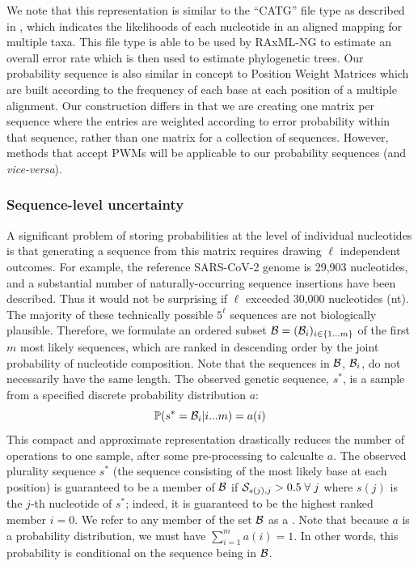 \documentclass[10pt]{article}
\begin{document}
We note that this representation is similar to the ``CATG'' file type as described in \citet{kozlovModelsOptimizationsTools2018}, which indicates the likelihoods of each nucleotide in an aligned mapping for multiple taxa. 
This file type is able to be used by RAxML-NG to estimate an overall error rate which is then used to estimate phylogenetic trees.
Our probability sequence is also similar in concept to Position Weight Matrices \citep[PWMs, ][]{stormoUsePerceptronAlgorithm1982} which are built according to the frequency of each base at each position of a multiple alignment. 
Our construction differs in that we are creating one matrix per sequence where the entries are weighted according to error probability within that sequence, rather than one matrix for a collection of sequences. 
However, methods that accept PWMs will be applicable to our probability sequences (and \emph{vice-versa}).


\subsubsection{Sequence-level uncertainty}

A significant problem of storing probabilities at the level of individual nucleotides is that generating a sequence from this matrix requires drawing $\ell$ independent outcomes.
For example, the reference SARS-CoV-2 genome is 29,903 nucleotides, and a substantial number of naturally-occurring sequence insertions have been described.
Thus it would not be surprising if $\ell$ exceeded 30,000 nucleotides (nt).
The majority of these technically possible $5^\ell$ sequences are not biologically plausible.
Therefore, we formulate an ordered subset $\mathcal{B} = (\mathcal{B}_i)_{i\in\{1\ldots m\} }$ of the first $m$ most likely sequences, which are ranked in descending order by the joint probability of nucleotide composition.
Note that the sequences in $\mathcal{B}$, $\mathcal{B}_i$, do not necessarily have the same length.
The observed genetic sequence, $s^*$, is a sample from a specified discrete probability distribution $a$:
\begin{equation}
\mathbb{P}(s^* = \mathcal{B}_i | i ... m) = a(i)
\end{equation}
This compact and approximate representation drastically reduces the number of operations to one sample, after some pre-processing to calcualte $a$.
The observed plurality sequence $s^*$ (the sequence consisting of the most likely base at each position) is guaranteed to be a member of $\mathcal{B}$ if $\mathcal{S}_{s(j), j} > 0.5\;\forall\;j$ where $s(j)$ is the $j$-th nucleotide of $s^*$; indeed, it is guaranteed to be the highest ranked member $i=0$.
We refer to any member of the set $\mathcal{B}$ as a \emph{\slps}.
Note that because $a$ is a probability distribution, we must have $\sum_{i=1}^m a(i) = 1$.
In other words, this probability is conditional on the sequence being in $\mathcal{B}$.
\end{document}
